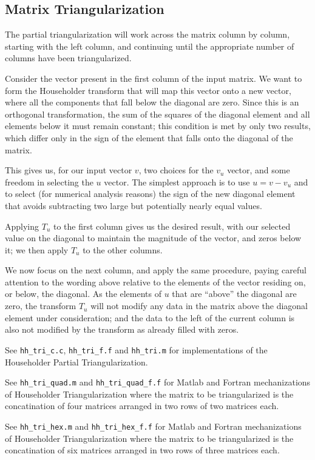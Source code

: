\subsection{Matrix Triangularization}

The partial triangularization will work across the matrix
column by column,
starting with the left column,
and continuing until the appropriate number of columns
have been triangularized.

Consider the vector present in the first column
of the input matrix.
We want to form the Householder transform
that will map this vector onto a new vector,
where all the components that fall below the diagonal
are zero.
Since this is an orthogonal transformation,
the sum of the squares of the diagonal element
and all elements below it must remain constant;
this condition is met by only two results,
which differ only in the sign of the element
that falls onto the diagonal of the matrix.

This gives us, for our input vector $v$,
two choices for the $v_u$ vector, and
some freedom in selecting the $u$ vector.
The simplest approach is to use
$u = v - v_u$
and to select (for numerical analysis reasons)
the sign of the new diagonal element
that avoids subtracting two large but
potentially nearly equal values.

Applying $T_u$ to the first column gives us
the desired result, with our selected value
on the diagonal to maintain the magnitude
of the vector, and zeros below it; we
then apply $T_u$ to the other columns.

We now focus on the next column, and
apply the same procedure,
paying careful attention to the wording above
relative to the elements of the vector
residing on, or below, the diagonal.
As the elements of $u$ that are ``above''
the diagonal are zero,
the transform $T_u$ will not modify
any data in the matrix above the diagonal
element under consideration;
and the data to the left of the current column
is also not modified by the transform
as already filled with zeros.

See \verb|hh_tri_c.c|, \verb|hh_tri_f.f| and \verb|hh_tri.m|
for implementations
of the Householder Partial Triangularization.

See \verb|hh_tri_quad.m| and \verb|hh_tri_quad_f.f|
for Matlab and Fortran mechanizations of
Householder Triangularization
where the matrix to be triangularized
is the concatination of four matrices
arranged in two rows of two matrices each.

See \verb|hh_tri_hex.m| and \verb|hh_tri_hex_f.f|
for Matlab and Fortran mechanizations of
Householder Triangularization
where the matrix to be triangularized
is the concatination of six matrices
arranged in two rows of three matrices each.
